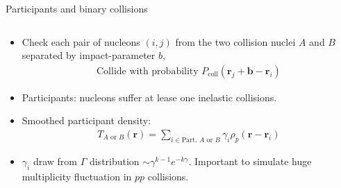 \documentclass[11pt, aspectratio=169]{beamer}
\begin{document}
\begin{frame}{Participants and binary collisions}
\begin{columns}
\begin{column}{.7\textwidth}
\begin{itemize}
\item Check each pair of nucleons $(i,j)$ from the two collision nuclei $A$ and $B$ separated by impact-parameter $b$,
\begin{eqnarray}
\nonumber
\textrm{Collide with probability }P_{\textrm{coll}}(\mathbf{r}_j+\mathbf{b}-\mathbf{r}_i)
\end{eqnarray}
\item Participants: nucleons suffer at lease one inelastic collisions. 
\item<2-> Smoothed participant density:
\begin{eqnarray}
\nonumber
T_{A \textrm{ or }B}(\mathbf{r}) = \sum_{i\in \textrm{Part. $A$ or $B$}} \gamma_i \rho_p(\mathbf{r}-\mathbf{r}_i)
\end{eqnarray}
\item<2-> $\gamma_i$ draw from $\Gamma$ distribution $\sim \gamma^{k-1} e^{-k\gamma}$. Important to simulate huge multiplicity fluctuation in $pp$ collisions.
\end{itemize}
\end{column}
\end{columns}
\end{frame}
\end{document}
